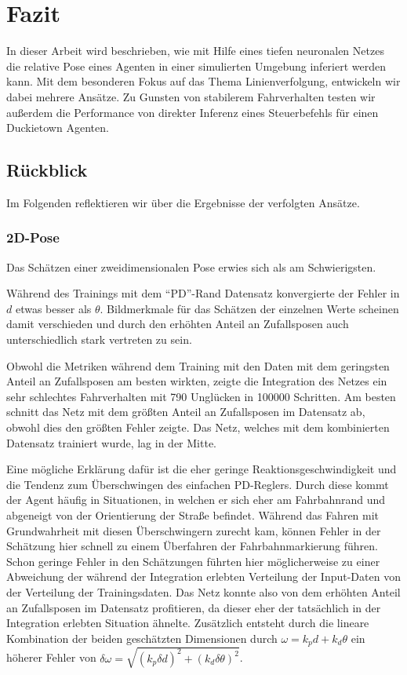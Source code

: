 \chapter{Fazit}

In dieser Arbeit wird beschrieben, wie mit Hilfe eines tiefen neuronalen Netzes die relative Pose eines Agenten in einer simulierten Umgebung inferiert werden kann. Mit dem besonderen Fokus auf das Thema Linienverfolgung, entwickeln wir dabei mehrere Ansätze. Zu Gunsten von stabilerem Fahrverhalten testen wir außerdem die Performance von direkter Inferenz eines Steuerbefehls für einen Duckietown Agenten.

\section{Rückblick}

Im Folgenden reflektieren wir über die Ergebnisse der verfolgten Ansätze.

\subsection{2D-Pose}

Das Schätzen einer zweidimensionalen Pose erwies sich als am Schwierigsten.

Während des Trainings mit dem ``PD''-Rand Datensatz konvergierte der Fehler in $d$ etwas besser als $\theta$. Bildmerkmale für das Schätzen der einzelnen Werte scheinen damit verschieden und durch den erhöhten Anteil an Zufallsposen auch unterschiedlich stark vertreten zu sein.

Obwohl die Metriken während dem Training mit den Daten mit dem geringsten Anteil an Zufallsposen am besten wirkten, zeigte die Integration des Netzes ein sehr schlechtes Fahrverhalten mit 790 Unglücken in 100000 Schritten. Am besten schnitt das Netz mit dem größten Anteil an Zufallsposen im Datensatz ab, obwohl dies den größten Fehler zeigte. Das Netz, welches mit dem kombinierten Datensatz trainiert wurde, lag in der Mitte.

Eine mögliche Erklärung dafür ist die eher geringe Reaktionsgeschwindigkeit und die Tendenz zum Überschwingen des einfachen PD-Reglers. Durch diese kommt der Agent häufig in Situationen, in welchen er sich eher am Fahrbahnrand und abgeneigt von der Orientierung der Straße befindet. Während das Fahren mit Grundwahrheit mit diesen Überschwingern zurecht kam, können Fehler in der Schätzung hier schnell zu einem Überfahren der Fahrbahnmarkierung führen. Schon geringe Fehler in den Schätzungen führten hier möglicherweise zu einer Abweichung der während der Integration erlebten Verteilung der Input-Daten von der Verteilung der Trainingsdaten. Das Netz konnte also von dem erhöhten Anteil an Zufallsposen im Datensatz profitieren, da dieser eher der tatsächlich in der Integration erlebten Situation ähnelte. Zusätzlich entsteht durch die lineare Kombination der beiden geschätzten Dimensionen durch $\omega = k_p d + k_d \theta$ ein höherer Fehler von $\delta\omega = \sqrt{(k_p\delta d)^2 + (k_d\delta \theta)^2}$.

